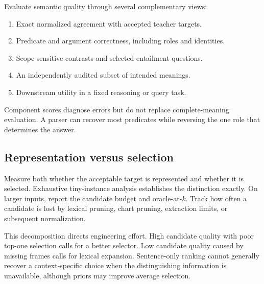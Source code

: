 \documentclass[11pt,a4paper]{article}
\begin{document}
Evaluate semantic quality through several complementary views:
\begin{enumerate}
  \item Exact normalized agreement with accepted teacher targets.
  \item Predicate and argument correctness, including roles and identities.
  \item Scope-sensitive contrasts and selected entailment questions.
  \item An independently audited subset of intended meanings.
  \item Downstream utility in a fixed reasoning or query task.
\end{enumerate}
Component scores diagnose errors but do not replace complete-meaning
evaluation. A parser can recover most predicates while reversing the one
role that determines the answer.

\subsection{Representation versus selection}
Measure both whether the acceptable target is represented and whether it is
selected. Exhaustive tiny-instance analysis establishes the distinction
exactly. On larger inputs, report the candidate budget and oracle-at-\(k\).
Track how often a candidate is lost by lexical pruning, chart pruning,
extraction limits, or subsequent normalization.

This decomposition directs engineering effort. High candidate quality with
poor top-one selection calls for a better selector. Low candidate quality
caused by missing frames calls for lexical expansion. Sentence-only ranking cannot generally recover a context-specific choice
when the distinguishing information is unavailable, although priors may
improve average selection.
\end{document}
